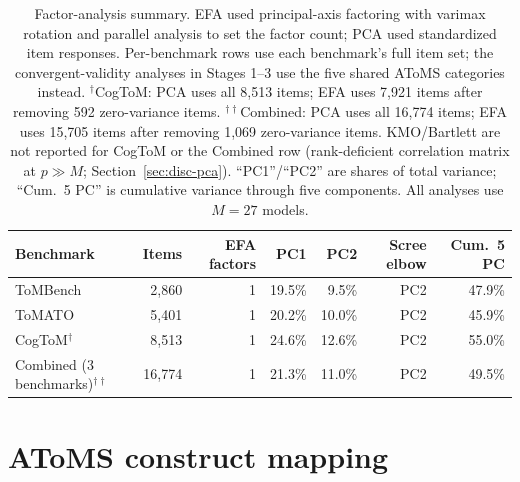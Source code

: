 \documentclass{article} %
\begin{document}
\begin{table}[h]
\centering
\small
\caption{Factor-analysis summary. EFA used principal-axis factoring with varimax rotation and parallel analysis to set the factor count; PCA used standardized item responses. Per-benchmark rows use each benchmark's full item set; the convergent-validity analyses in Stages 1--3 use the five shared AToMS categories instead. $^\dagger$CogToM: PCA uses all 8,513 items; EFA uses 7,921 items after removing 592 zero-variance items. $^{\dagger\dagger}$Combined: PCA uses all 16,774 items; EFA uses 15,705 items after removing 1,069 zero-variance items. KMO/Bartlett are not reported for CogToM or the Combined row (rank-deficient correlation matrix at $p\gg M$; Section~\ref{sec:disc-pca}). ``PC1''/``PC2'' are shares of total variance; ``Cum.\ 5 PC'' is cumulative variance through five components. All analyses use $M=27$ models.}
\label{tab:factor_analysis}
\begin{tabular}{lrrrrrr}
\toprule
Benchmark & Items & EFA factors & PC1 & PC2 & Scree elbow & Cum.\ 5 PC \\
\midrule
ToMBench & 2{,}860 & 1 & 19.5\% & 9.5\%  & PC2 & 47.9\% \\
ToMATO   & 5{,}401 & 1 & 20.2\% & 10.0\% & PC2 & 45.9\% \\
CogToM$^\dagger$ & 8{,}513 & 1 & 24.6\% & 12.6\% & PC2 & 55.0\% \\
Combined (3 benchmarks)$^{\dagger\dagger}$ & 16{,}774 & 1 & 21.3\% & 11.0\%  & PC2 & 49.5\% \\
\bottomrule
\end{tabular}
\end{table}
 
\section{AToMS construct mapping}
\label{app:atoms-map}
 
\end{document}
